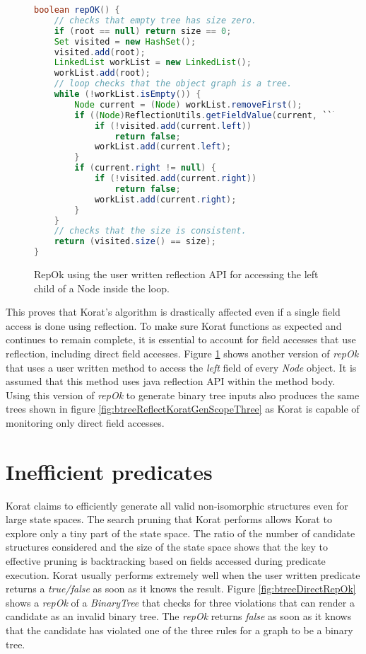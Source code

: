 \begin{figure}
\centering
\begin{lstlisting}[language=Java]
boolean repOK() {
    // checks that empty tree has size zero.
    if (root == null) return size == 0;
    Set visited = new HashSet();
    visited.add(root);
    LinkedList workList = new LinkedList();
    workList.add(root);
    // loop checks that the object graph is a tree.
    while (!workList.isEmpty()) {
        Node current = (Node) workList.removeFirst();
        if ((Node)ReflectionUtils.getFieldValue(current, ``left'') != null) {
            if (!visited.add(current.left))
                return false;
            workList.add(current.left);
        }
        if (current.right != null) {
            if (!visited.add(current.right))
                return false;
            workList.add(current.right);
        }
    }
    // checks that the size is consistent.
    return (visited.size() == size);
}
\end{lstlisting}
\caption{RepOk using the user written reflection API for accessing the left child of a Node inside the loop.}
\label{fig:btTreeUserReflectionRepOK}
\end{figure}

\para
This proves that Korat’s algorithm is drastically affected even if a single field access is done using reflection. To make sure Korat functions as expected and continues to remain complete, it is essential to account for field accesses that use reflection, including direct field accesses. Figure \ref{fig:btTreeUserReflectionRepOK} shows another version of \emph{repOk} that uses a user written method to access the \emph{left} field of every \emph{Node} object. It is assumed that this method uses java reflection API within the method body. Using this version of \emph{repOk} to generate binary tree inputs also produces the same trees shown in figure \ref{fig:btreeReflectKoratGenScopeThree} as Korat is capable of monitoring only direct field accesses. 


\section{Inefficient predicates}
\label{sec:inefficient-predicates}
Korat claims to efficiently generate all valid non-isomorphic structures even for large state spaces. The search pruning that Korat performs allows Korat to explore only a tiny part of the state space. The ratio of the number of candidate structures considered and the size of the state space shows that the key to effective pruning is backtracking based on fields accessed during predicate execution. Korat usually performs extremely well when the user written predicate returns a \emph{true/false} as soon as it knows the result. Figure \ref{fig:btreeDirectRepOk} shows a \emph{repOk} of a \emph{BinaryTree} that checks for three violations that can render a candidate as an invalid binary tree. The \emph{repOk} returns \emph{false} as soon as it knows that the candidate has violated one of the three rules for a graph to be a binary tree.

